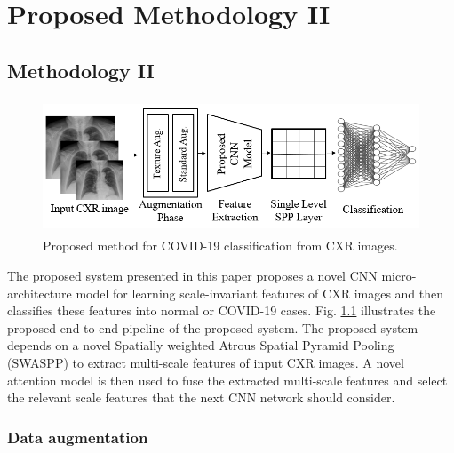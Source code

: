 
\chapter{Proposed Methodology II} %

\label{chp:proposed} %

\section{Methodology II} 

\begin{center}
    \begin{figure}[htbp]
    \centerline{\includegraphics[height=40mm,width=15cm]{Figures/ProposedPipe.png}}
    \caption{Proposed method for COVID-19 classification from CXR images.}
    \label{ProposedPipe}
    \end{figure}
    \end{center}
    
The proposed system presented in this paper proposes a novel  CNN micro-architecture model for learning  scale-invariant features of   CXR  images and then classifies these features into normal or COVID-19 cases. Fig. \ref{ProposedPipe} illustrates the proposed end-to-end pipeline  of the proposed system. The proposed system depends on a novel Spatially weighted Atrous Spatial Pyramid Pooling (SWASPP) to extract multi-scale features of input CXR images. A novel attention model is then used to fuse the extracted multi-scale  features and select the relevant scale features that the next CNN network should consider.
\subsection{Data augmentation}


